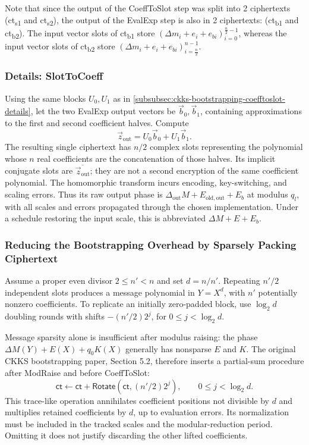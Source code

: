 Note that since the output of the \textsf{CoeffToSlot} step was split into 2 ciphertexts (\textsf{ct\textsubscript{s1}} and \textsf{ct\textsubscript{s2}}), the output of the \textsf{EvalExp} step is also in 2 ciphertexts: (\textsf{ct\textsubscript{b1}} and \textsf{ct\textsubscript{b2}}). The input vector slots of \textsf{ct\textsubscript{b1}} store $(\Delta m_i + e_i + e_{bi})_{i=0}^{\frac{n}{2} - 1}$, whereas the input vector slots of \textsf{ct\textsubscript{b2}} store $(\Delta m_i + e_i + e_{bi})_{i=\frac{n}{2}}^{n - 1}$.


\subsubsection{Details: \textsf{SlotToCoeff}}
\label{subsubsec:ckks-bootstrapping-slottocoeff-details}

Using the same blocks $U_0,U_1$ as in \autoref{subsubsec:ckks-bootstrapping-coefftoslot-details}, let the two EvalExp output vectors be $\vec b_0,\vec b_1$, containing approximations to the first and second coefficient halves. Compute
\[
\vec z_{\mathrm{out}}=U_0\vec b_0+U_1\vec b_1.
\]
The resulting single ciphertext has $n/2$ complex slots representing the polynomial whose $n$ real coefficients are the concatenation of those halves. Its implicit conjugate slots are $\overline{\vec z_{\mathrm{out}}}$; they are not a second encryption of the same coefficient polynomial. The homomorphic transform incurs encoding, key-switching, and scaling errors. Thus its raw output phase is $\Delta_{\mathrm{out}}M+E_{\mathrm{old,out}}+E_b$ at modulus $q_l$, with all scales and errors propagated through the chosen implementation. Under a schedule restoring the input scale, this is abbreviated $\Delta M+E+E_b$.

\subsubsection{Reducing the Bootstrapping Overhead by Sparsely Packing Ciphertext}
\label{subsubsec:ckks-bootstrapping-time-reduction}

Assume a proper even divisor $2\leq n'<n$ and set $d=n/n'$. Repeating $n'/2$ independent slots produces a message polynomial in $Y=X^d$, with $n'$ potentially nonzero coefficients. To replicate an initially zero-padded block, use $\log_2 d$ doubling rounds with shifts $-(n'/2)2^j$, for $0\leq j<\log_2d$.

Message sparsity alone is insufficient after modulus raising: the phase $\Delta M(Y)+E(X)+q_0K(X)$ generally has nonsparse $E$ and $K$. The original CKKS bootstrapping paper, Section 5.2, therefore inserts a partial-sum procedure after ModRaise and before CoeffToSlot:
\[
\textsf{ct}\leftarrow\textsf{ct}+\textsf{Rotate}(\textsf{ct},(n'/2)2^j),
\qquad 0\leq j<\log_2d.
\]
This trace-like operation annihilates coefficient positions not divisible by $d$ and multiplies retained coefficients by $d$, up to evaluation errors. Its normalization must be included in the tracked scales and the modular-reduction period. Omitting it does not justify discarding the other lifted coefficients.

